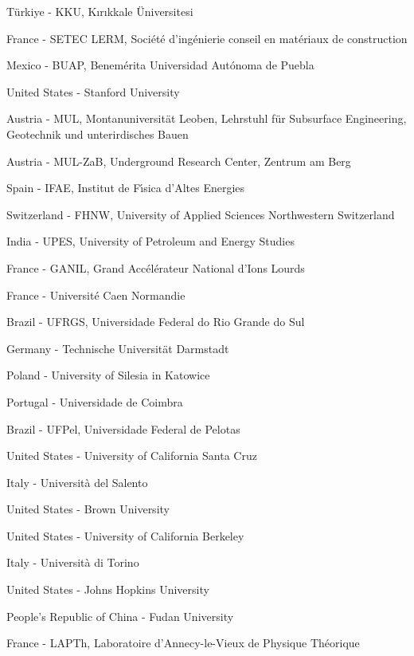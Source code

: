 \item[$^{214}$] T{\"u}rkiye - KKU, K{\i}r{\i}kkale {\"U}niversitesi
\item[$^{215}$] France - SETEC LERM, Soci{\'e}t{\'e} d'ing{\'e}nierie conseil en mat{\'e}riaux de construction
\item[$^{216}$] Mexico - BUAP, Benem{\'e}rita Universidad Aut{\'o}noma de Puebla
\item[$^{217}$] United States - Stanford University
\item[$^{218}$] Austria - MUL, Montanuniversit{\"a}t Leoben, Lehrstuhl f{\"u}r Subsurface Engineering, Geotechnik und unterirdisches Bauen
\item[$^{219}$] Austria - MUL-ZaB, Underground Research Center, Zentrum am Berg
\item[$^{220}$] Spain - IFAE, Institut de F{\'\i}sica d'Altes Energies
\item[$^{221}$] Switzerland - FHNW, University of Applied Sciences Northwestern Switzerland
\item[$^{222}$] India - UPES, University of Petroleum and Energy Studies
\item[$^{223}$] France - GANIL, Grand Acc{\'e}l{\'e}rateur National d'Ions Lourds
\item[$^{224}$] France - Universit{\'e} Caen Normandie
\item[$^{225}$] Brazil - UFRGS, Universidade Federal do Rio Grande do Sul
\item[$^{226}$] Germany - Technische Universit{\"a}t Darmstadt
\item[$^{227}$] Poland - University of Silesia in Katowice
\item[$^{228}$] Portugal - Universidade de Coimbra
\item[$^{229}$] Brazil - UFPel, Universidade Federal de Pelotas
\item[$^{230}$] United States - University of California Santa Cruz
\item[$^{231}$] Italy - Universit{\`a} del Salento
\item[$^{232}$] United States - Brown University
\item[$^{233}$] United States - University of California Berkeley
\item[$^{234}$] Italy - Universit{\`a} di Torino
\item[$^{235}$] United States - Johns Hopkins University
\item[$^{236}$] People's Republic of China - Fudan University
\item[$^{237}$] France - LAPTh, Laboratoire d'Annecy-le-Vieux de Physique Th{\'e}orique
